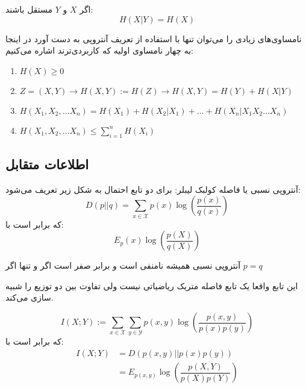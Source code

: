 \begin{theorem}
اگر
$X$
و
$Y$
مستقل باشند:
$$H(X|Y) = H(X)$$
\end{theorem}
\begin{theorem}
	نامساوی‌های زیادی را می‌توان تنها با استفاده از تعریف آنتروپی به دست آورد در اینجا به چهار نامساوی اولیه که کاربردی‌ترند اشاره می‌کنیم:
	\begin{enumerate}
\item $H(X) \geq 0 $
\item $Z = (X, Y) \rightarrow H(X, Y) := H(Z) \rightarrow H(X, Y) = H(Y) + H(X|Y) $
\item $H(X_1, X_2, \dots X_n) = H(X_1) + H(X_2 | X_1) + \dots + H(X_n | X_1 X_2 \dots X_n)$
\item $H(X_1, X_2, \dots X_n) \leq \sum_{i = 1}^{n} H(X_i)$
\end{enumerate}
\end{theorem}
\subsection{اطلاعات متقابل}
\begin{definition}
آنتروپی نسبی یا فاصله کولبک لیبلر: برای دو تابع احتمال به شکل زیر تعریف می‌شود:
$$
D(p||q) = \sum_{x \in \mathcal{X}} p(x) \log(\dfrac{p(x)}{q(x)})
$$
که برابر است با:
$$E_p(x) \log(\dfrac{p(X)}{q(X)})$$
\end{definition}
\begin{theorem}
آنتروپی نسبی همیشه نامنفی است و برابر صفر است اگر و تنها اگر
$p = q$
\end{theorem}
این تابع واقعا یک تابع فاصله متریک ریاضیاتی نیست ولی تفاوت بین دو توزیع را شبیه سازی می‌کند.
\begin{definition}
$$I(X; Y) := \sum_{x \in \mathcal{X}} \sum_{y \in \mathcal{Y}} p(x, y) \log(\dfrac{p(x, y)}{p(x)p(y)})$$
که برابر است با:
\begin{align*}
    I(X;Y) &= D(p(x, y) || p(x)p(y))
    \\
    &= E_{p(x, y)} \log(\dfrac{p(X, Y)}{p(X)p(Y)})
\end{align*}
\end{definition}

